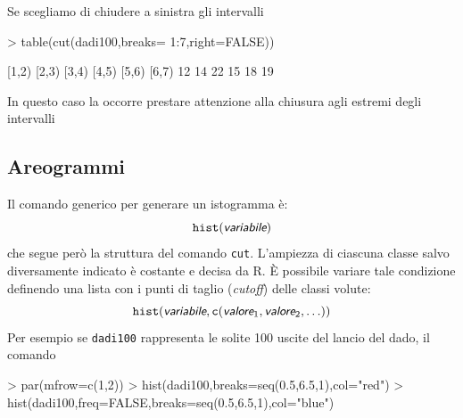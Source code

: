 \documentclass[onecolumn,12pt]{book}
\newcommand{\varia}[1]{\textsl{\textsf{#1}}}
\begin{document}
Se scegliamo di chiudere a sinistra gli intervalli
\begin{Schunk}
\begin{Sinput}
> table(cut(dadi100,breaks= 1:7,right=FALSE))
\end{Sinput}
\begin{Soutput}
[1,2) [2,3) [3,4) [4,5) [5,6) [6,7) 
   12    14    22    15    18    19 
\end{Soutput}
\end{Schunk}
In questo caso la occorre prestare attenzione alla chiusura agli estremi degli intervalli\subsection{Areogrammi}
Il comando generico per generare un istogramma \`e:
\begin{equation*}
\texttt{hist}(\varia{variabile})
\end{equation*}
che segue per\`o la struttura del comando \texttt{cut}. L'ampiezza di ciascuna classe salvo diversamente indicato \`e costante e decisa da \textsf{R}.
\`E  possibile variare tale condizione definendo una lista con i punti di taglio ({\it cutoff}) delle classi volute:
\begin{equation} \texttt{hist}(\varia{variabile},\texttt{c}(\varia{valore}_1, \varia{valore}_2, \ldots))
\end{equation}
Per esempio se \texttt{dadi100} rappresenta le solite 100 uscite del lancio del dado, il comando
\begin{Schunk}
\begin{Sinput}
> par(mfrow=c(1,2))
> hist(dadi100,breaks=seq(0.5,6.5,1),col="red")
> hist(dadi100,freq=FALSE,breaks=seq(0.5,6.5,1),col="blue")
\end{Sinput}
\end{Schunk}
\end{document}
